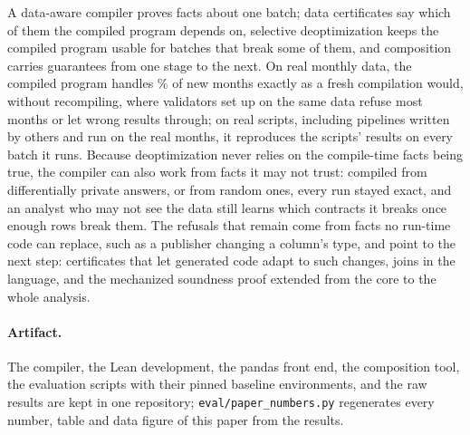 A data-aware compiler proves facts about one batch; data certificates say which of them the compiled
program depends on, selective deoptimization keeps the compiled program usable for batches that break
some of them, and composition carries guarantees from one stage to the next. On real monthly data,
the compiled program handles \RealDeoptCorrectPct\% of new months exactly as a fresh compilation
would, without recompiling, where validators set up on the same data refuse most months or let wrong
results through; on real scripts, including pipelines written by others and run on the real months, it reproduces
the scripts' results on every batch it runs. Because deoptimization never relies on the compile-time
facts being true, the compiler can also work from facts it may not trust: compiled from differentially
private answers, or from random ones, every run stayed exact, and an analyst who may not see the data
still learns which contracts it breaks once enough rows break them. The
refusals that remain come from facts no run-time code can replace, such as a publisher changing a
column's type, and point to the next step: certificates that let generated code adapt to such
changes, joins in the language, and the mechanized soundness proof extended from the core
to the whole analysis.

\paragraph{Artifact.} The compiler, the Lean development, the pandas front end, the composition tool,
the evaluation scripts with their pinned baseline environments, and the raw results are kept in one
repository; \texttt{eval/\allowbreak paper\_numbers.py} regenerates every number, table and data figure of this
paper from the results.

